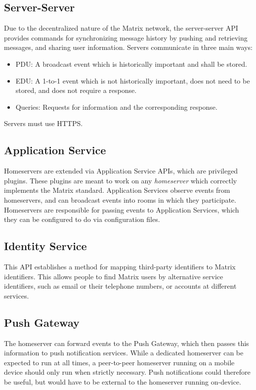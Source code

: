 \subsection{Server-Server}
Due to the decentralized nature of the Matrix network, the server-server \ac{API} provides commands for synchronizing message history by pushing and retrieving messages, and sharing user information.
Servers communicate in three main ways:
\begin{itemize}
    \item \ac{PDU}: A broadcast event which is historically important and shall be stored.
    \item \ac{EDU}: A 1-to-1 event which is not historically important, does not need to be stored, and does not require a response.
    \item Queries: Requests for information and the corresponding response.
\end{itemize}
Servers must use \ac{HTTPS}.

\subsection{Application Service}
Homeservers are extended via Application Service \ac{API}s, which are privileged plugins.
These plugins are meant to work on any \textit{homeserver} which correctly implements the Matrix standard.
Application Services observe events from homeservers, and can broadcast events into rooms in which they participate.
Homeservers are responsible for passing events to Application Services, which they can be configured to do via configuration files.

\subsection{Identity Service}
This \ac{API} establishes a method for mapping third-party identifiers to Matrix identifiers.
This allows people to find Matrix users by alternative service identifiers, such as email or their telephone numbers, or accounts at different services.

\subsection{Push Gateway}
The homeserver can forward events to the Push Gateway, which then passes this information to push notification services.
While a dedicated homeserver can be expected to run at all times, a peer-to-peer homeserver running on a mobile device should only run when strictly necessary.
Push notifications could therefore be useful, but would have to be external to the homeserver running on-device.

